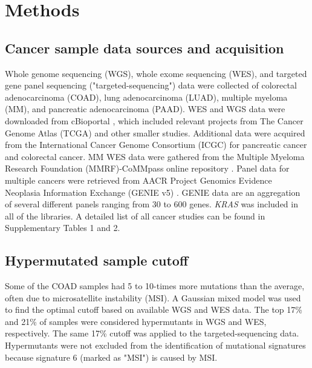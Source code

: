 \documentclass[english, 10pt, letterpaper]{article}
\newcommand{\KRAS}{\emph{KRAS}}
\begin{document}



\section*{Methods}

\subsection*{Cancer sample data sources and acquisition}

Whole genome sequencing (WGS), whole exome sequencing (WES), and targeted gene panel sequencing ("targeted-sequencing") data were collected of colorectal adenocarcinoma (COAD), lung adenocarcinoma (LUAD), multiple myeloma (MM), and pancreatic adenocarcinoma (PAAD).
WES and WGS data were downloaded from cBioportal \cite{Gao2013, Cerami2012}, which included relevant projects from The Cancer Genome Atlas (TCGA) \cite{CancerGenomeAtlasNetwork2012, CancerGenomeAtlasResearchNetwork2014, CancerGenomeAtlasResearchNetwork.Electronicaddress:andrew_aguirredfci.harvard.edu2017} and other smaller studies. 
Additional data were acquired from the International Cancer Genome Consortium (ICGC) for pancreatic cancer \cite{Scarlett2011} and colorectal cancer. 
MM WES data were gathered from the Multiple Myeloma Research Foundation (MMRF)-CoMMpass online repository \cite{Walker2019AAnalysis.}.
Panel data for multiple cancers were retrieved from AACR Project Genomics Evidence Neoplasia Information Exchange (GENIE v5) \cite{AACRProjectGENIEConsortium2017AACRConsortium.}.
GENIE data are an aggregation of several different panels ranging from 30 to 600 genes.
\KRAS{} was included in all of the libraries. 
A detailed list of all cancer studies can be found in Supplementary Tables 1 and 2.


\subsection*{Hypermutated sample cutoff}

Some of the COAD samples had 5 to 10-times more mutations than the average, often due to microsatellite instability (MSI). 
A Gaussian mixed model was used to find the optimal cutoff based on available WGS and WES data. 
The top 17\% and 21\% of samples were considered hypermutants in WGS and WES, respectively.
The same 17\% cutoff was applied to the targeted-sequencing data. 
Hypermutants were not excluded from the identification of mutational signatures because signature 6 (marked as "MSI") is caused by MSI.
\end{document}
